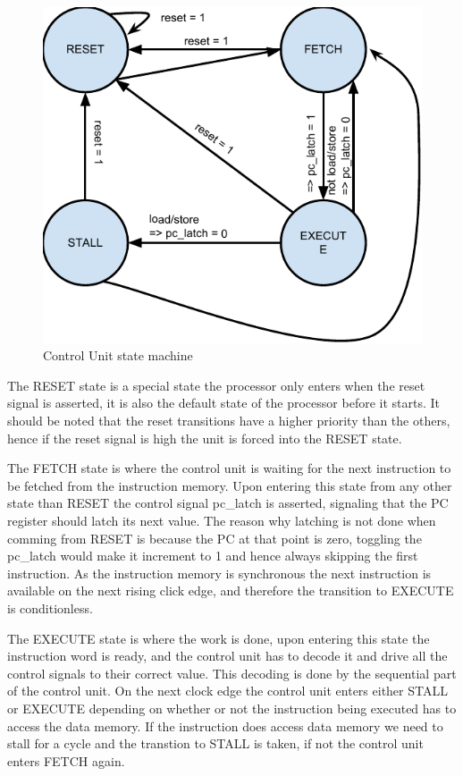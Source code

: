 \begin{figure}[h]
    \centering\includegraphics[scale=0.8]{figures/control_unit_state_machine}
    \caption{Control Unit state machine}
\end{figure}

The RESET state is a special state the processor only enters when the reset signal is asserted, it is also the default state of the processor before it starts. It should be noted that the reset transitions have a higher priority than the others, hence if the reset signal is high the unit is forced into the RESET state.

The FETCH state is where the control unit is waiting for the next instruction to be fetched from the instruction memory. Upon entering this state from any other state than RESET the control signal pc\_latch is asserted, signaling that the PC register should latch its next value. The reason why latching is not done when comming from RESET is because the PC at that point is zero, toggling the pc\_latch would make it increment to 1 and hence always skipping the first instruction. As the instruction memory is synchronous the next instruction is available on the next rising click edge, and therefore the transition to EXECUTE is conditionless.

The EXECUTE state is where the work is done, upon entering this state the instruction word is ready, and the control unit has to decode it and drive all the control signals to their correct value. This decoding is done by the sequential part of the control unit. On the next clock edge the control unit enters either STALL or EXECUTE depending on whether or not the instruction being executed has to access the data memory. If the instruction does access data memory we need to stall for a cycle and the transtion to STALL is taken, if not the control unit enters FETCH again.

